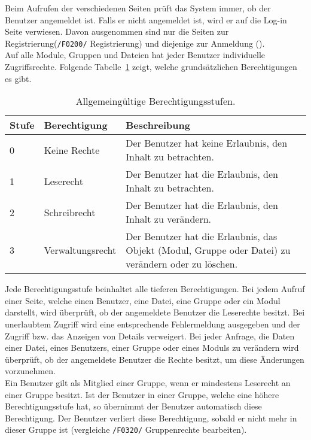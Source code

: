 

Beim Aufrufen der verschiedenen Seiten prüft das System immer, ob der Benutzer angemeldet ist. Falls er nicht angemeldet ist, wird er auf die Log-in Seite verwiesen. Davon ausgenommen sind nur die Seiten zur Registrierung(\texttt{/F0200/} Registrierung) und diejenige zur Anmeldung (). \\

Auf alle Module, Gruppen und Dateien hat jeder Benutzer individuelle Zugriffsrechte. Folgende Tabelle~\ref{tab:rights} zeigt, welche grundsätzlichen Berechtigungen es gibt.

\begin{table}[H]
\begin{tabularx}{\textwidth}{|l|l|X|} \hline
\textbf{Stufe} & \textbf{Berechtigung}     & \textbf{Beschreibung} \\ \hline
0     & Keine Rechte     & Der Benutzer hat keine Erlaubnis, den Inhalt zu betrachten.\\ \hline
1     & Leserecht        & Der Benutzer hat die Erlaubnis, den Inhalt zu betrachten.\\ \hline
2     & Schreibrecht     & Der Benutzer hat die Erlaubnis, den Inhalt zu verändern.\\ \hline
3     & Verwaltungsrecht & Der Benutzer hat die Erlaubnis, das Objekt (Modul, Gruppe oder Datei) zu verändern oder zu löschen.\\ \hline
\end{tabularx}
\caption{Allgemeingültige Berechtigungsstufen.}
\label{tab:rights}
\end{table}

Jede Berechtigungsstufe beinhaltet alle tieferen Berechtigungen. Bei jedem Aufruf einer Seite, welche einen Benutzer, eine Datei, eine Gruppe oder ein Modul darstellt, wird überprüft, ob der angemeldete Benutzer die Leserechte besitzt. Bei unerlaubtem Zugriff wird eine entsprechende Fehlermeldung ausgegeben und der Zugriff bzw. das Anzeigen von Details verweigert. Bei jeder Anfrage, die Daten einer Datei, eines Benutzers, einer Gruppe oder eines Moduls zu verändern wird überprüft, ob der angemeldete Benutzer die Rechte besitzt, um diese Änderungen vorzunehmen.\\

Ein Benutzer gilt als Mitglied einer Gruppe, wenn er mindestens Leserecht an einer Gruppe besitzt. Ist der Benutzer in einer Gruppe, welche eine höhere Berechtigungsstufe hat, so übernimmt der Benutzer automatisch diese Berechtigung. Der Benutzer verliert diese Berechtigung, sobald er nicht mehr in dieser Gruppe ist (vergleiche \texttt{/F0320/} Gruppenrechte bearbeiten).\\

